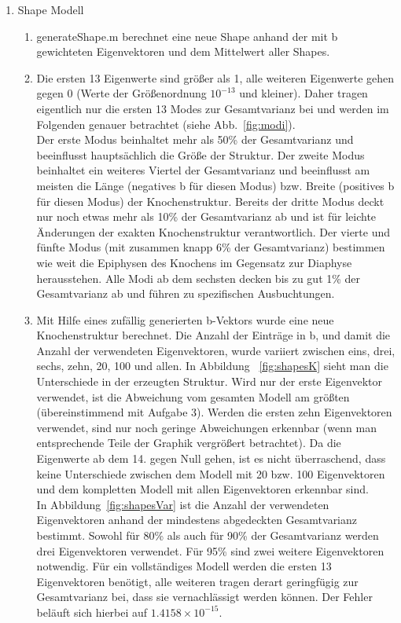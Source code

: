 \documentclass[]{report}
\begin{document}
\begin{enumerate}
			\item Shape Modell
			\begin{enumerate}
				\item
				generateShape.m berechnet eine neue Shape anhand der mit b gewichteten Eigenvektoren und dem Mittelwert aller Shapes.
				\item 
			Die ersten 13 Eigenwerte sind größer als 1, alle weiteren Eigenwerte gehen gegen 0 (Werte der Größenordnung $10^{-13}$ und kleiner). Daher tragen eigentlich nur die ersten 13 Modes zur Gesamtvarianz bei und werden im Folgenden genauer betrachtet (siehe Abb.~\ref{fig:modi}).\\
			Der erste Modus beinhaltet mehr als 50\% der Gesamtvarianz und beeinflusst hauptsächlich die Größe der Struktur.
			Der zweite Modus beinhaltet ein weiteres Viertel der Gesamtvarianz und beeinflusst am meisten die Länge (negatives b für diesen Modus) bzw. Breite (positives b für diesen Modus) der Knochenstruktur.
			Bereits der dritte Modus deckt nur noch etwas mehr als 10\% der Gesamtvarianz ab und ist für leichte Änderungen der exakten Knochenstruktur verantwortlich.
			Der vierte und fünfte Modus (mit zusammen knapp 6\% der Gesamtvarianz) bestimmen wie weit die Epiphysen des Knochens im Gegensatz zur Diaphyse herausstehen.
			Alle Modi ab dem sechsten decken bis zu gut 1\% der Gesamtvarianz ab und führen zu spezifischen Ausbuchtungen.
			\item
			Mit Hilfe eines zufällig generierten b-Vektors wurde eine neue Knochenstruktur berechnet. Die Anzahl der Einträge in b, und damit die Anzahl der verwendeten Eigenvektoren, wurde variiert zwischen eins, drei, sechs, zehn, 20, 100 und allen. In Abbildung ~\ref{fig:shapesK} sieht man die Unterschiede in der erzeugten Struktur. Wird nur der erste Eigenvektor verwendet, ist die Abweichung vom gesamten Modell am größten (übereinstimmend mit Aufgabe 3). Werden die ersten zehn Eigenvektoren verwendet, sind nur noch geringe Abweichungen erkennbar (wenn man entsprechende Teile der Graphik vergrößert betrachtet). Da die Eigenwerte ab dem 14. gegen Null gehen, ist es nicht überraschend, dass keine Unterschiede zwischen dem Modell mit 20 bzw. 100 Eigenvektoren und dem kompletten Modell mit allen Eigenvektoren erkennbar sind.\\
			In Abbildung~\ref{fig:shapesVar} ist die Anzahl der verwendeten Eigenvektoren anhand der mindestens abgedeckten Gesamtvarianz bestimmt. Sowohl für 80\% als auch für 90\% der Gesamtvarianz werden drei Eigenvektoren verwendet. Für 95\% sind zwei weitere Eigenvektoren notwendig. Für ein vollständiges Modell werden die ersten 13 Eigenvektoren benötigt, alle weiteren tragen derart geringfügig zur Gesamtvarianz bei, dass sie vernachlässigt werden können. Der Fehler beläuft sich hierbei auf $1.4158\times 10^{-15}$.

\end{enumerate}
\end{enumerate}
\end{document}
